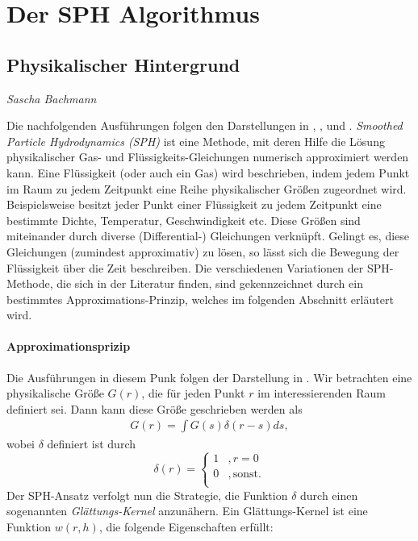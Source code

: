 
\chapter{Der SPH Algorithmus}
\thispagestyle{empty}
\label{chap:sph}

\section{Physikalischer Hintergrund}

\begin{center}
\emph{{\small Sascha Bachmann}}
\end{center}

\bigskip

\noindent Die nachfolgenden Ausführungen folgen den Darstellungen in \cite{IntroSPH}, \cite{FlowSPH}, \cite{FluidSim} und \cite{BoundarySPH}. \emph{Smoothed Particle Hydrodynamics (SPH)} ist eine Methode, mit deren Hilfe die Lösung physikalischer Gas- und Flüssigkeits-Gleichungen numerisch approximiert werden kann. Eine Flüssigkeit (oder auch ein Gas) wird beschrieben, indem jedem Punkt im Raum zu jedem Zeitpunkt eine Reihe physikalischer Größen zugeordnet wird. Beispielsweise besitzt jeder Punkt einer Flüssigkeit zu jedem Zeitpunkt eine bestimmte Dichte, Temperatur, Geschwindigkeit etc. Diese Größen sind miteinander durch diverse (Differential-) Gleichungen verknüpft. Gelingt es, diese Gleichungen (zumindest approximativ) zu lösen, so lässt sich die Bewegung der Flüssigkeit über die Zeit beschreiben. Die verschiedenen Variationen der SPH-Methode, die sich in der Literatur finden, sind gekennzeichnet durch ein bestimmtes Approximations-Prinzip, welches im folgenden Abschnitt erläutert wird.
\medskip

\subsubsection*{Approximationsprizip} Die Ausführungen in diesem Punk folgen der Darstellung in \cite[S. 89 f]{IntroSPH}. Wir betrachten eine physikalische Größe $G(r)$, die für jeden Punkt $r$ im interessierenden Raum definiert sei. Dann kann diese Größe geschrieben werden als
\begin{align}\label{eqn1}
G(r) = \int G(s)\delta(r - s) ds,
\end{align}
wobei $\delta$ definiert ist durch
\[
\delta(r) = \begin{cases}
1 & , r = 0 \\
0 & , \text{sonst}.\\
\end{cases}
\]
Der SPH-Ansatz verfolgt nun die Strategie, die Funktion $\delta$ durch einen sogenannten \emph{Glättungs-Kernel} anzunähern. Ein Glättungs-Kernel ist eine Funktion $w(r, h)$, die folgende Eigenschaften erfüllt:

